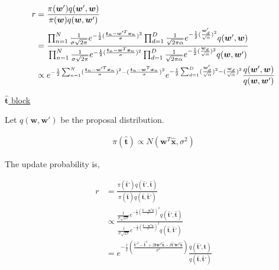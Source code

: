 \documentclass[10pt]{homeworg}
\begin{document}
\begin{align*}
r &= \frac{\pi(\boldsymbol w')q(\boldsymbol w',\boldsymbol w)}{\pi(\boldsymbol w)q(\boldsymbol w, \boldsymbol w')}\\
\vspace{0.5cm}
  &= \frac{\prod_{n=1}^N \frac{1}{\sigma \sqrt{2\pi}} e^{-\frac{1}{2}(\frac{\boldsymbol t_n-\boldsymbol w'^T\boldsymbol x_n}{\sigma})^2} \prod_{d=1}^D \frac{1}{\sqrt{2\pi\alpha}} e^{-\frac{1}{2} (\frac{\boldsymbol w'_d}{\sqrt{\alpha}})^2} q(\boldsymbol w',\boldsymbol w)}{\prod_{n=1}^N \frac{1}{\sigma \sqrt{2\pi}} e^{-\frac{1}{2}(\frac{\boldsymbol t_n-\boldsymbol w^T\boldsymbol x_n}{\sigma})^2} \prod_{d=1}^D \frac{1}{\sqrt{2\pi\alpha}} e^{-\frac{1}{2} (\frac{\boldsymbol w_d}{\sqrt{\alpha}})^2} q(\boldsymbol w, \boldsymbol w')}\\
  \vspace{0.5cm}
  &\propto e^{-\frac{1}{2}\sum_{n=1}^N (\frac{\boldsymbol t_n-\boldsymbol w'^T\boldsymbol x_n}{\sigma})^2 - (\frac{\boldsymbol t_n-\boldsymbol w^T\boldsymbol x_n}{\sigma})^2} e^{-\frac{1}{2}\sum_{d=1}^D (\frac{\boldsymbol w'_d}{\sqrt{\alpha}})^2 - (\frac{\boldsymbol w_d}{\sqrt{\alpha}})^2}\frac{q(\boldsymbol w',\boldsymbol w)}{q(\boldsymbol w, \boldsymbol w')}
\end{align*}


\underline{$\hat{\boldsymbol t}$ block}

Let $q(\boldsymbol w, \boldsymbol w')$ be the proposal distribution.

\begin{align*}
\pi(\hat{\boldsymbol t}) \propto N(\boldsymbol w^T\hat{\boldsymbol x}, \sigma^2)
\end{align*}

The update probability is,

\begin{align*}
r &= \frac{\pi(\hat{\boldsymbol t}')q(\hat{\boldsymbol t}',\hat{\boldsymbol t})}{\pi(\hat{\boldsymbol t})q(\hat{\boldsymbol t}, \hat{\boldsymbol t}')}\\
  &\propto \frac{\frac{1}{\sigma\sqrt{2\pi}}e^{-\frac{1}{2}(\frac{\hat{\boldsymbol t}'-\boldsymbol w^T\hat{\boldsymbol x}}{\sigma})^2}q(\hat{\boldsymbol t}', \hat{\boldsymbol t})}{\frac{1}{\sigma\sqrt{2\pi}}e^{-\frac{1}{2}(\frac{\hat{\boldsymbol t}-\boldsymbol w^T\hat{\boldsymbol x}}{\sigma})^2}q(\hat{\boldsymbol t}, \hat{\boldsymbol t}')}\\
  &= e^{-\frac{1}{2}(\frac{\hat{\boldsymbol t}'^2-\hat{\boldsymbol t}^2+2\hat{\boldsymbol t}\boldsymbol w^T\hat{\boldsymbol x}-2\hat{\boldsymbol t}'\boldsymbol w^T\hat{\boldsymbol x}}{\sigma^2})}\frac{q(\hat{\boldsymbol t}', \hat{\boldsymbol t})}{q(\hat{\boldsymbol t}, \hat{\boldsymbol t}')}
\end{align*}
\end{document}

